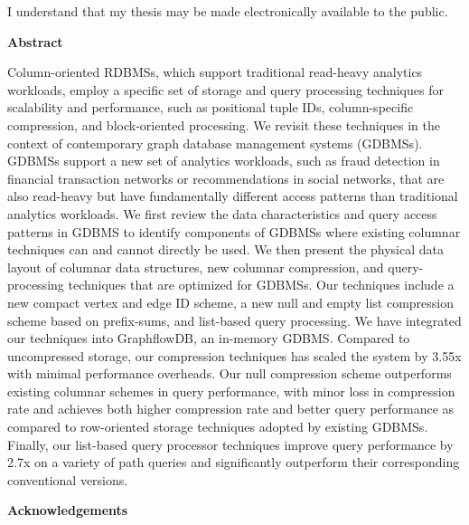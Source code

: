 \bigskip
  
\noindent
I understand that my thesis may be made electronically available to the public.

\cleardoublepage


\begin{center}\textbf{Abstract}\end{center}

Column-oriented RDBMSs, which support traditional read-heavy analytics workloads, employ a specific set of storage and query processing techniques for scalability and performance, such as positional tuple IDs, column-specific compression, and block-oriented processing. We revisit these techniques in the context of contemporary graph database management systems (GDBMSs). GDBMSs support a new set of analytics workloads, such as fraud detection in financial transaction networks or recommendations in social networks, that are also read-heavy but have fundamentally different access patterns than traditional analytics workloads. We first review the data characteristics and query access patterns in GDBMS to identify components of GDBMSs where existing columnar techniques can and cannot directly be used. We then present the physical data layout of columnar data structures, new columnar compression, and query-processing techniques that are optimized for GDBMSs. Our techniques include a new compact vertex and edge ID scheme, a new null and empty list compression scheme based on prefix-sums, and list-based query processing. We have integrated our techniques into GraphflowDB, an in-memory GDBMS. Compared to uncompressed storage, our compression techniques has scaled the system by 3.55x with minimal performance overheads. Our null compression scheme outperforms existing columnar schemes in query performance, with minor loss in compression rate and achieves both higher compression rate and better query performance as compared to row-oriented storage techniques adopted by existing GDBMSs. Finally, our list-based query processor techniques improve query performance by 2.7x on a variety of path queries and significantly outperform their corresponding conventional versions.

\cleardoublepage


\begin{center}\textbf{Acknowledgements}\end{center}

